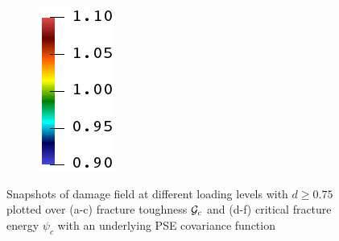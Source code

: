 \begin{figure}[!htbp]
\begin{subfigure}[b]{0.08\textwidth}
    \includegraphics[width=\textwidth]{Chapter4/figures/rainbow_vertical.png}
    \vspace{0.15in}
  \end{subfigure}
  \caption{Snapshots of damage field at different loading levels with $d \geqslant 0.75$ plotted over (a-c) fracture toughness ${\mathcal{G}_c}$ and (d-f) critical fracture energy $\psi_c$ with an underlying PSE covariance function }
  \label{fig: Chapter4/2D/compare_sensitivity_sqexp}
\end{figure}

